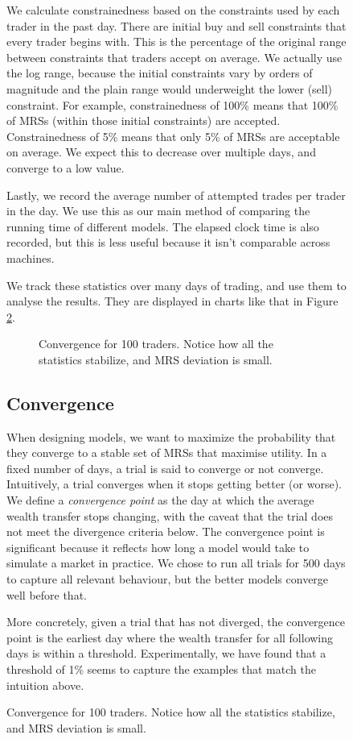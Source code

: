 \documentclass[12pt,a4paper,titlepage]{article}
\begin{document}
\begin{figure}[H]
We calculate constrainedness based on the constraints used by each trader in the past day.
There are initial buy and sell constraints that every trader begins with.
This is the percentage of the original range between constraints that traders accept on average.
We actually use the log range, because the initial constraints vary by orders of magnitude and the plain range would underweight the lower (sell) constraint.
For example, constrainedness of 100\% means that 100\% of MRSs (within those initial constraints) are accepted.
Constrainedness of 5\% means that only 5\% of MRSs are acceptable on average.
We expect this to decrease over multiple days, and converge to a low value.

Lastly, we record the average number of attempted trades per trader in the day.
We use this as our main method of comparing the running time of different models.
The elapsed clock time is also recorded, but this is less useful because it isn't comparable across machines.

We track these statistics over many days of trading, and use them to analyse the results.
They are displayed in charts like that in Figure \ref{fig:conv}.

\begin{figure}[H]
    \centering
    
    \caption{
      Convergence for 100 traders.
      Notice how all the statistics stabilize, and MRS deviation is small.
    }
    \label{fig:conv}
\end{figure}

\subsection{Convergence}
When designing models, we want to maximize the probability that they converge to a stable set of MRSs that maximise utility.
In a fixed number of days, a trial is said to converge or not converge.
Intuitively, a trial converges when it stops getting better (or worse).
We define a \textit{convergence point} as the day at which the average wealth transfer stops changing, with the caveat that the trial does not meet the divergence criteria below.
The convergence point is significant because it reflects how long a model would take to simulate a market in practice.
We chose to run all trials for 500 days to capture all relevant behaviour, but the better models converge well before that.

More concretely, given a trial that has not diverged, the convergence point is the earliest day where the wealth transfer for all following days is within a threshold.
Experimentally, we have found that a threshold of 1\% seems to capture the examples that match the intuition above.


\end{figure}
\end{document}

